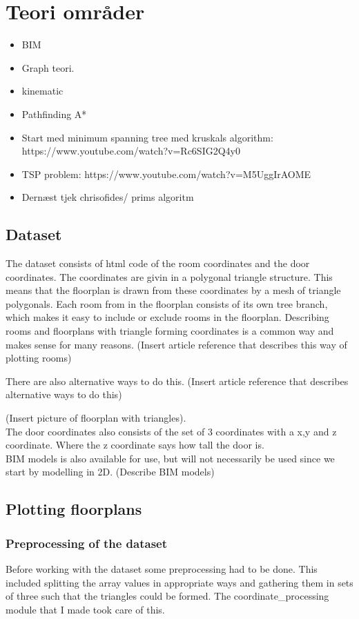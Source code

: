 \section{Teori områder}

\begin{itemize}
    \item BIM
    \item Graph teori.
    \item kinematic 
    \item Pathfinding A*
    \item Start med minimum spanning tree med kruskals algorithm: https://www.youtube.com/watch?v=Rc6SIG2Q4y0
    \item TSP problem:
https://www.youtube.com/watch?v=M5UggIrAOME
    \item Dernæst tjek chrisofides/ prims algoritm
\end{itemize}




\subsection{Dataset}
The dataset consists of html code of the room coordinates and the door coordinates. The coordinates are givin in a polygonal triangle structure. This means that the floorplan is drawn from these coordinates by a mesh of triangle polygonals. Each room from in the floorplan consists of its own tree branch, which makes it easy to include or exclude rooms in the floorplan. 
Describing rooms and floorplans with triangle forming coordinates is a common way and makes sense for many reasons.
(Insert article reference that describes this way of plotting rooms)

There are also alternative ways to do this. 
(Insert article reference that describes alternative ways to do this)


(Insert picture of floorplan with triangles).
\\
The door coordinates also consists of the set of 3 coordinates with a x,y and z coordinate. Where the z coordinate says how tall the door is. 
\\
BIM models is also available for use, but will not necessarily be used since we start by modelling in 2D.
(Describe BIM models)

\subsection{Plotting floorplans}
\subsubsection{Preprocessing of the dataset}
Before working with the dataset some preprocessing had to be done. This included splitting the array values in appropriate ways and gathering them in sets of three such that the triangles could be formed. The coordinate\_processing module that I made took care of this.


